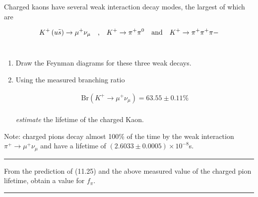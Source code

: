 \begin{problem}{11.8}
Charged kaons have several weak interaction decay modes, the largest of which are

\begin{align*}
    K^+\left( u\overbar{s} \right) \to \mu^+ \nu_\mu \comma K^+\to\pi^+\pi^0 \andtxt K^+\to\pi^+\pi^+\pi-
\end{align*}\\
\begin{enumerate}[label=(\alph*)]
    \item Draw the Feynman diagrams for these three weak decays.
    \item Using the measured branching ratio 
    
    \begin{align*}
        \text{Br}\left( K^+ \to \mu^+\nu_\mu \right) = 63.55 \pm 0.11 \%
    \end{align*}\\
    \textit{estimate} the lifetime of the charged Kaon.
\end{enumerate}\vspace{0.12in}
Note: charged pions decay almost 100\% of the time by the weak interaction $\pi^+\to\mu^+\nu_\mu$ and have a lifetime of $(2.6033 \pm 0.0005) \times 10^{-8} $s.
\end{problem}
\begin{solution}

\end{solution}

\noindent\rule{7in}{1.5pt}


\begin{problem}{11.9}
From the prediction of (11.25) and the above measured value of the charged pion lifetime, obtain a value for $f_\pi$.
\end{problem}
\begin{solution}

\end{solution}

\noindent\rule{7in}{1.5pt}


